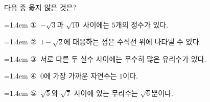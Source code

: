 다음 중 옳지 \underline{않은} 것은?
\par\medskip\par\noindent\hangindent=1.4em {\small ①}\ $-\sqrt{3}$과 $\sqrt{10}$ 사이에는 $5$개의 정수가 있다.\par\noindent\hangindent=1.4em {\small ②}\ $1-\sqrt{2}$에 대응하는 점은 수직선 위에 나타낼 수 있다.\par\noindent\hangindent=1.4em {\small ③}\ 서로 다른 두 실수 사이에는 무수히 많은 유리수가 있다.\par\noindent\hangindent=1.4em {\small ④}\ $0$에 가장 가까운 자연수는 $1$이다.\par\noindent\hangindent=1.4em {\small ⑤}\ $\sqrt{5}$와 $\sqrt{7}$ 사이에 있는 무리수는 $\sqrt{6}$뿐이다.\par\medskip
